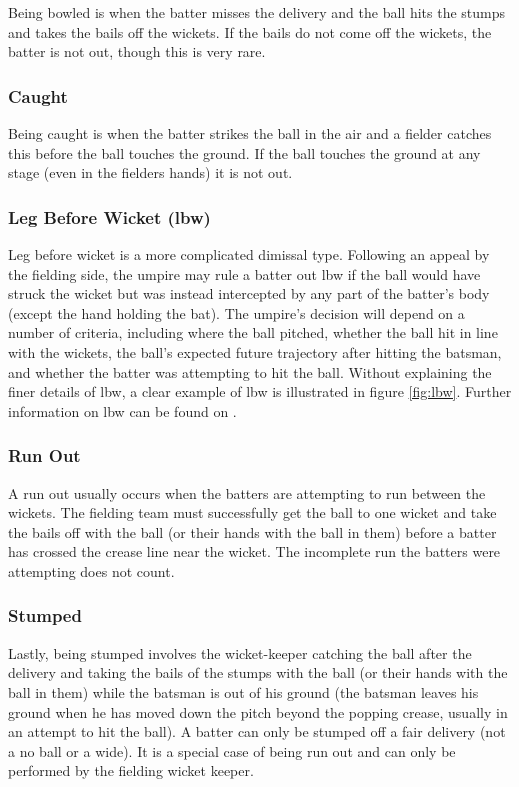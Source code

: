 \documentclass[12pt,a4paper]{report}
\theoremstyle{definition}
\begin{document}
Being bowled is when the batter misses the delivery and the ball hits the stumps and takes the bails off the wickets.
If the bails do not come off the wickets, the batter is not out, though this is very rare.

\subsubsection{Caught}

Being caught is when the batter strikes the ball in the air and a fielder catches this before the ball touches the ground.
If the ball touches the ground at any stage (even in the fielders hands) it is not out.

\subsubsection{Leg Before Wicket (lbw)}

Leg before wicket is a more complicated dimissal type.
Following an appeal by the fielding side, the umpire may rule a batter out lbw if the ball would have struck the wicket but was instead intercepted by any part of the batter's body (except the hand holding the bat). 
The umpire's decision will depend on a number of criteria, including where the ball pitched, whether the ball hit in line with the wickets, the ball's expected future trajectory after hitting the batsman, and whether the batter was attempting to hit the ball.
Without explaining the finer details of lbw, a clear example of lbw is illustrated in figure \ref{fig:lbw}. 
Further information on lbw can be found on \citet{lbwWiki}.

\subsubsection{Run Out}

A run out usually occurs when the batters are attempting to run between the wickets.
The fielding team must successfully get the ball to one wicket and take the bails off with the ball (or their hands with the ball in them) before a batter has crossed the crease line near the wicket. 
The incomplete run the batters were attempting does not count.

\subsubsection{Stumped}

Lastly, being stumped involves the wicket-keeper catching the ball after the delivery and taking the bails of the stumps with the ball (or their hands with the ball in them) while the batsman is out of his ground (the batsman leaves his ground when he has moved down the pitch beyond the popping crease, usually in an attempt to hit the ball).
A batter can only be stumped off a fair delivery (not a no ball or a wide).
It is a special case of being run out and can only be performed by the fielding wicket keeper.
\end{document}

